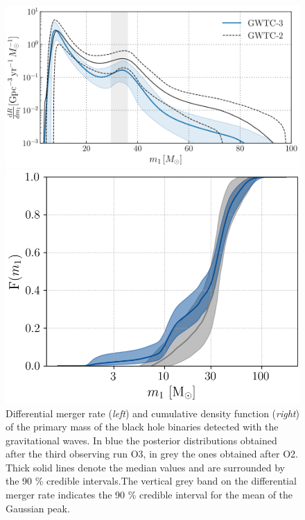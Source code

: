 \documentclass[a4paper,titlepage]{book}     	%
\begin{document}
\begin{figure}
	\begin{minipage}{.60\textwidth}
		\centering
		\includegraphics[width=\textwidth]{./images/MassMergerRate.png}
	\end{minipage}
	\hfill
	\begin{minipage}{.39\textwidth}
		\vspace{1mm}
		\centering
		\includegraphics[width=\textwidth]{./images/MassCumulative.png}	
	\end{minipage}
	\caption{Differential merger rate (\emph{left}) and cumulative density function (\emph{right}) of the primary mass of the black hole binaries detected with the gravitational waves. In blue the posterior distributions obtained after the third observing run O3, in grey the ones obtained after O2. Thick solid lines denote the median values and are surrounded by the 90 \% credible intervals.The vertical grey band on the differential merger rate indicates the 90 \% credible interval for the mean of the Gaussian peak. \cite{GWTC-3_interpretation}}\label{fig:primarymassspectrum}
\end{figure}
\end{document}
